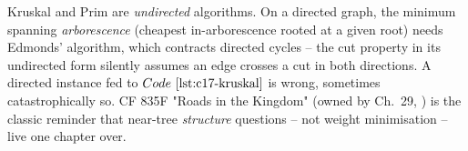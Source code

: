 \begin{warningbox}
Kruskal and Prim are \emph{undirected} algorithms.  On a directed graph, the
minimum spanning \emph{arborescence} (cheapest in-arborescence rooted at a given
root) needs Edmonds' algorithm, which contracts directed cycles -- the cut
property in its undirected form silently assumes an edge crosses a cut in both
directions.  A directed instance fed to \(\coderef{c17-kruskal}\) is wrong,
sometimes catastrophically so.  CF 835F "Roads in the Kingdom" (owned by
Ch.~29, ) is the classic reminder that near-tree \emph{structure}
questions -- not weight minimisation -- live one chapter over.
\end{warningbox}

\begin{recallbox}
\end{recallbox}
